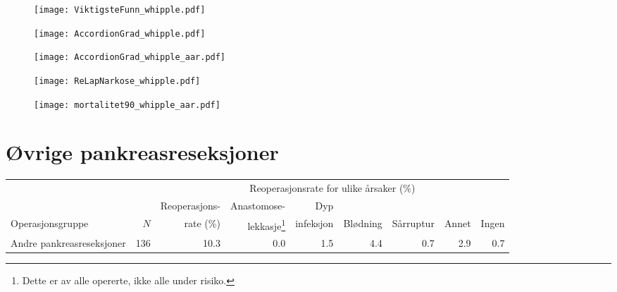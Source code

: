 \documentclass[norsk,a4paper]{article}\usepackage[]{graphicx}\usepackage[]{color}
\begin{document}
\begin{figure}[ht]
\centering
\texttt{[image: ViktigsteFunn\_whipple.pdf]}
\caption{}
\end{figure}

\begin{figure}[ht]
\centering
\texttt{[image: AccordionGrad\_whipple.pdf]}
\caption{}
\end{figure}

\begin{figure}[ht]
\centering
\texttt{[image: AccordionGrad\_whipple\_aar.pdf]}
\caption{}
\end{figure}


\begin{figure}[ht]
\centering
\texttt{[image: ReLapNarkose\_whipple.pdf]}
\caption{}
\end{figure}

\begin{figure}[ht]
\centering
\texttt{[image: mortalitet90\_whipple\_aar.pdf]}
\caption{}
\end{figure}

\clearpage

\section{Øvrige pankreasreseksjoner}

\addtolength{\hoffset}{-1.5cm}

\begin{table}[htb]
\begin{minipage}{\textwidth}
\centering
\begin{tabular}{lrrrrrrrr}
  \toprule
  & & & \multicolumn{4}{c}{Reoperasjonsrate for ulike årsaker (\%)} \\
 \cline{4-9} 
 & & Reoperasjons- & Anastomose- & Dyp &&&&  \\
 Operasjonsgruppe & $N$ & rate (\%) & lekkasje\footnote[2]{Dette er av alle opererte, ikke
alle under risiko.} & infeksjon & Blødning & Sårruptur & Annet & Ingen \\
 \midrule
Andre pankreasreseksjoner & 136 & 10.3 & 0.0 & 1.5 & 4.4 & 0.7 & 2.9 & 0.7 \\ 
   \bottomrule
\end{tabular}

\end{minipage}
\end{table}
\end{document}

